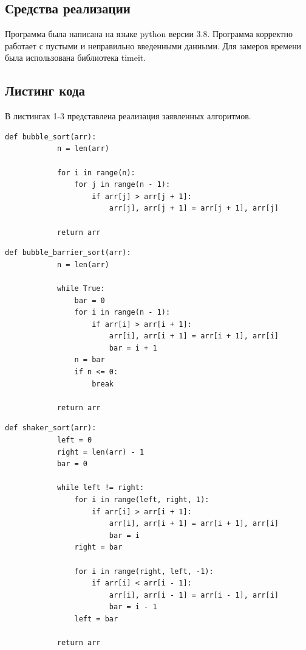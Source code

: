 \documentclass[a4paper, 14pt]{article}
\begin{document}
		\subsection{Средства реализации}
		\parindent=0cm		
		Программа была написана на языке python версии 3.8.
		Программа корректно работает с пустыми и неправильно введенными данными.
		Для замеров времени была использована библиотека timeit.\\
        \subsection{Листинг кода} 
        В листингах 1-3 представлена реализация заявленных алгоритмов.
		\begin{lstlisting}[label=some-code,caption=Алгоритм сортировки пузырьком]
		def bubble_sort(arr):
    		n = len(arr)

    		for i in range(n):
        		for j in range(n - 1):
            		if arr[j] > arr[j + 1]:
                		arr[j], arr[j + 1] = arr[j + 1], arr[j]

    		return arr
		\end{lstlisting}        
		
		\begin{lstlisting}[label=some-code,caption=Алгоритм сортировки пузырьком с барьером]
		def bubble_barrier_sort(arr):
    		n = len(arr)

    		while True:
        		bar = 0
        		for i in range(n - 1):
            		if arr[i] > arr[i + 1]:
                		arr[i], arr[i + 1] = arr[i + 1], arr[i]
                		bar = i + 1
        		n = bar
        		if n <= 0:
            		break

    		return arr
		\end{lstlisting} 
		\begin{lstlisting}[label=some-code,caption=Алгоритм шейкер-сортировки]
		def shaker_sort(arr):
    		left = 0
    		right = len(arr) - 1
    		bar = 0

    		while left != right:
        		for i in range(left, right, 1):
            		if arr[i] > arr[i + 1]:
                		arr[i], arr[i + 1] = arr[i + 1], arr[i]
                		bar = i
        		right = bar

        		for i in range(right, left, -1):
            		if arr[i] < arr[i - 1]:
                		arr[i], arr[i - 1] = arr[i - 1], arr[i]
                		bar = i - 1
        		left = bar

    		return arr
		\end{lstlisting} 
\end{document}
